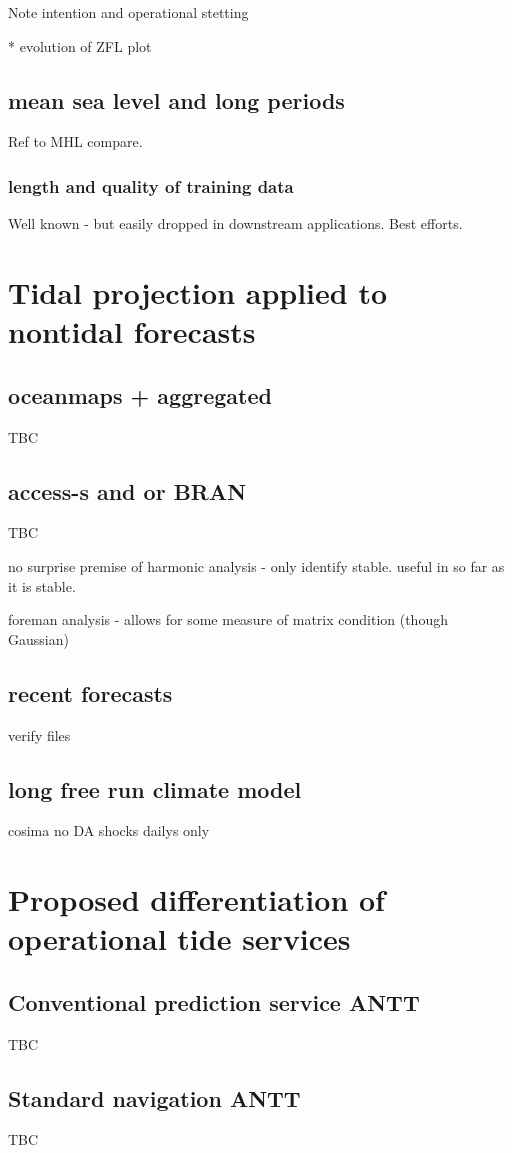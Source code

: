 Note intention and operational stetting

* evolution of ZFL
plot




\subsection{mean sea level and long periods}

Ref to MHL compare.

\subsubsection{length and quality of training data}

Well known - but easily dropped in downstream applications.
Best efforts.


\section{Tidal projection applied to nontidal forecasts}
\subsection{oceanmaps + aggregated}
TBC

\subsection{access-s and or BRAN}
TBC



no surprise
premise of harmonic analysis - only identify stable.
useful in so far as it is stable.

foreman analysis - allows for some measure of matrix condition (though Gaussian)


\subsection{ recent forecasts }
verify files


\subsection{ long free run climate model }
cosima
no DA shocks
dailys only


\section{Proposed differentiation of operational tide services}
\subsection{Conventional prediction service ANTT}

TBC

\subsection{Standard navigation ANTT}

TBC
